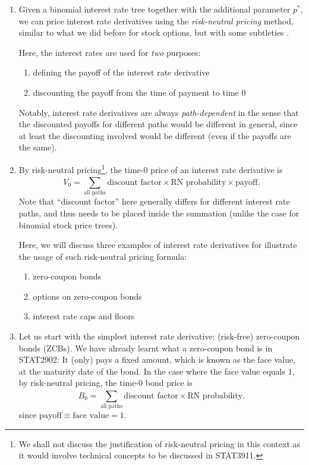 \begin{enumerate}
\item Given a binomial interest rate tree together with the additional
parameter \(p^*\), we can price interest rate derivatives using the
\emph{risk-neutral pricing} method, similar to what we did before for stock
options, but with some subtleties \warn{}.

Here, the interest rates are used for \emph{two} purposes:
\begin{enumerate}[label={(\arabic*)}]
\item defining the payoff of the interest rate derivative
\item discounting the payoff from the time of payment to time 0
\end{enumerate}
Notably, interest rate derivatives are always \emph{path-dependent} in the
sense that the discounted payoffs for different paths would be different in
general, since at least the discounting involved would be different (even if
the payoffs are the same).

\item \label{it:ir-deriv-rn-pricing}
By risk-neutral pricing\footnote{We shall not discuss the justification
of risk-neutral pricing in this context as it would involve technical concepts
to be discussed in STAT3911.}, the time-0 price of an interest rate derivative
is
\[
V_0=\boxed{\sum_{\text{all paths}}^{}\text{discount factor}\times \text{RN probability}\times \text{payoff}}.
\]
Note that ``discount factor'' here generally differs for different interest
rate paths, and thus needs to be placed inside the summation (unlike the case
for binomial stock price trees).

Here, we will discuss three examples of interest rate derivatives for
illustrate the usage of such risk-neutral pricing formula:
\begin{enumerate}[label={(\arabic*)}]
\item zero-coupon bonds
\item options on zero-coupon bonds
\item interest rate caps and floors
\end{enumerate}

\item \label{it:zcb-rn-pricing-fmla}
Let us start with the simplest interest rate derivative: (risk-free)
zero-coupon bonds (ZCBs). We have already learnt what a zero-coupon bond is in
STAT2902: It (only) pays a fixed amount, which is known as the face value, at
the maturity date of the bond. In the case where the face value equals 1, by
risk-neutral pricing, the time-0 bond price is
\[
B_0=\boxed{\sum_{\text{all paths}}^{}\text{discount factor}\times \text{RN probability}}.
\]
since \(\text{payoff}\equiv\text{face value}=1\).


\end{enumerate}
